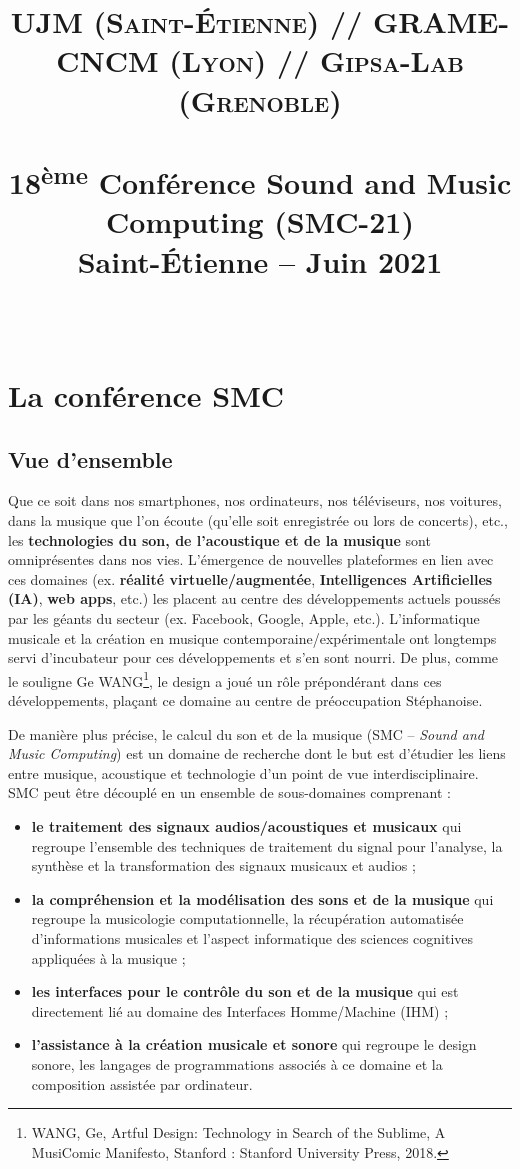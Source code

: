 \documentclass[fontsize=12pt]{scrartcl} %
\title{	
\normalfont \normalsize 
\textsc{UJM (Saint-Étienne) // GRAME-CNCM (Lyon) // Gipsa-Lab (Grenoble)} \\ [25pt] %
\horrule{0.5pt} \\[0.4cm] %
\huge 18\textsuperscript{ème} Conférence Sound and Music Computing (SMC-21)\\ Saint-Étienne -- Juin 2021 \\ %
\horrule{2pt} \\[0.5cm] %
}
\date{} %
\numberwithin{equation}{section} %
\numberwithin{figure}{section} %
\numberwithin{table}{section} %
\begin{document}
\maketitle %

\tableofcontents

\section{La conférence SMC}

\subsection{Vue d'ensemble}

Que ce soit dans nos smartphones, nos ordinateurs, nos téléviseurs, nos voitures, dans la musique que l’on écoute (qu’elle soit enregistrée ou lors de concerts), etc., les \textbf{technologies du son, de l’acoustique et de la musique} sont omniprésentes dans nos vies. L’émergence de nouvelles plateformes en lien avec ces domaines (ex. \textbf{réalité virtuelle/augmentée}, \textbf{Intelligences Artificielles (IA)}, \textbf{web apps}, etc.) les placent au centre des développements actuels poussés par les géants du secteur (ex. Facebook, Google, Apple, etc.). L’informatique musicale et la création en musique contemporaine/expérimentale ont longtemps servi d’incubateur pour ces développements et s’en sont nourri. De plus, comme le souligne Ge WANG\footnote{WANG, Ge, Artful Design: Technology in Search of the Sublime, A MusiComic Manifesto, Stanford : Stanford University Press, 2018.}, le design a joué un rôle prépondérant dans ces développements, plaçant ce domaine au centre de préoccupation Stéphanoise. 

De manière plus précise, le calcul du son et de la musique (SMC -- \textit{Sound and Music Computing}) est un domaine de recherche dont le but est d'étudier les liens entre musique, acoustique et technologie d'un point de vue interdisciplinaire. SMC peut être découplé en un ensemble de sous-domaines comprenant :

\begin{itemize}
  \item \textbf{le traitement des signaux audios/acoustiques et musicaux} qui regroupe l'ensemble des techniques de traitement du signal pour l'analyse, la synthèse et la transformation des signaux musicaux et audios ;
  \item \textbf{la compréhension et la modélisation des sons et de la musique} qui regroupe la musicologie computationnelle, la récupération automatisée d'informations musicales et l'aspect informatique des sciences cognitives appliquées à la musique ;
  \item \textbf{les interfaces pour le contrôle du son et de la musique} qui est directement lié au domaine des Interfaces Homme/Machine (IHM) ;
  \item \textbf{l'assistance à la création musicale et sonore} qui regroupe le design sonore, les langages de programmations associés à ce domaine et la composition assistée par ordinateur.
\end{itemize}
\end{document}
